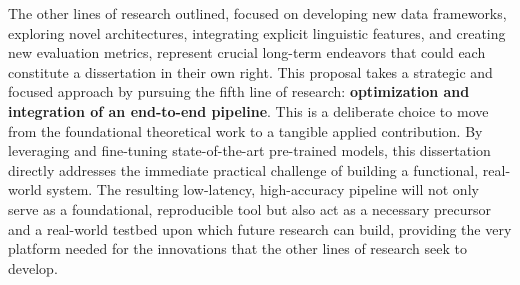 \noindent The other lines of research outlined, focused on developing new data frameworks, exploring novel architectures, integrating explicit linguistic features, and creating new evaluation metrics, represent crucial long-term endeavors that could each constitute a dissertation in their own right. This proposal takes a strategic and focused approach by pursuing the fifth line of research: \textbf{ optimization and integration of an end-to-end pipeline}. This is a deliberate choice to move from the foundational theoretical work to a tangible applied contribution. By leveraging and fine-tuning state-of-the-art pre-trained models, this dissertation directly addresses the immediate practical challenge of building a functional, real-world system. The resulting low-latency, high-accuracy pipeline will not only serve as a foundational, reproducible tool but also act as a necessary precursor and a real-world testbed upon which future research can build, providing the very platform needed for the innovations that the other lines of research seek to develop.
